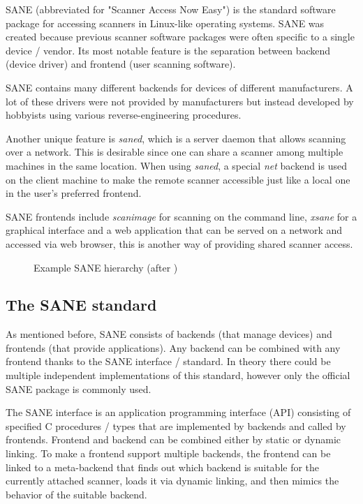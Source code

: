 \documentclass{article}
\begin{document}
SANE (abbreviated for "Scanner Access Now Easy") is the standard software package
for accessing scanners in Linux-like operating systems. SANE was created
because previous scanner software packages were often specific to a single device / vendor.
Its most notable feature is the separation between backend (device driver) 
and frontend (user scanning software).

SANE contains many different backends for devices of different manufacturers.
A lot of these drivers were not provided by manufacturers but instead
developed by hobbyists using various reverse-engineering procedures.

Another unique feature is {\it saned}, which is a server daemon that allows
scanning over a network. This is desirable since one can share a scanner
among multiple machines in the same location. When using {\it saned}, a
special {\it net} backend is used on the client machine to make
the remote scanner accessible just like a local one in the user's preferred frontend.

SANE frontends include {\it scanimage} for scanning on the command line,
{\it xsane} for a graphical interface and a web application that can be served
on a network and accessed via web browser, this is another way of providing shared
scanner access.

\begin{figure}[H]
  \caption{Example SANE hierarchy (after \cite[Figure 3.1]{sane_standard})}
  \centering
  \resizebox{\textwidth}{!}{}
  \label{sane_hierarchy}
\end{figure}

\subsection{The SANE standard}
\label{ssec:sanestd}

As mentioned before, SANE consists of backends (that manage devices) and frontends
(that provide applications). Any backend can be combined with any frontend
thanks to the SANE interface / standard. In theory there could be multiple independent
implementations of this standard, however only the official SANE package is
commonly used.

The SANE interface is an application programming interface (API) consisting
of specified C procedures / types that are implemented by backends and called by frontends.
Frontend and backend can be combined either by static or dynamic linking.
To make a frontend support multiple backends, the frontend can be linked to a
meta-backend that finds out which backend is suitable for the currently attached
scanner, loads it via dynamic linking, and then mimics the behavior
of the suitable backend. \cite[3.1]{sane_standard}
\end{document}
